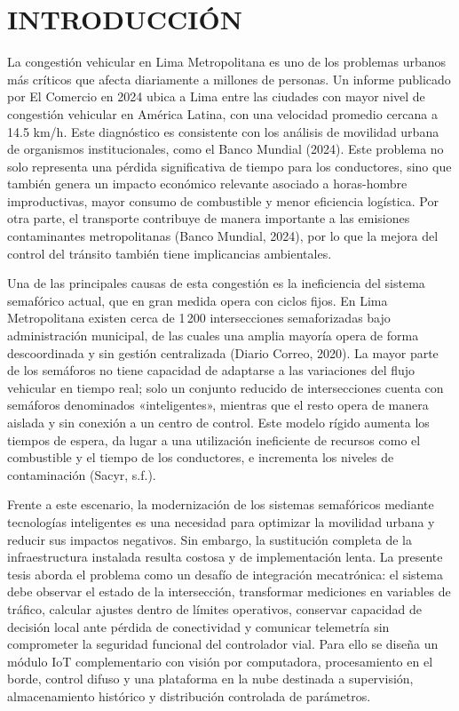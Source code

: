\chapter*{INTRODUCCIÓN}\label{introduccion}

La congestión vehicular en Lima Metropolitana es uno de los problemas urbanos más críticos que afecta
diariamente a millones de personas. Un informe publicado por El Comercio en 2024 ubica a Lima entre las
ciudades con mayor nivel de congestión vehicular en América Latina, con una velocidad promedio cercana a
14.5 km/h. Este diagnóstico es consistente con los análisis de movilidad urbana de organismos
institucionales, como el Banco Mundial (2024). Este problema no solo representa una pérdida significativa de tiempo para los conductores, sino
que también genera un impacto económico relevante asociado a horas-hombre improductivas, mayor consumo de
combustible y menor eficiencia logística. Por otra parte, el transporte contribuye de manera importante a
las emisiones contaminantes metropolitanas (Banco Mundial, 2024), por lo que la mejora del control del
tránsito también tiene implicancias ambientales.

Una de las principales causas de esta congestión es la ineficiencia del sistema semafórico actual, que en
gran medida opera con ciclos fijos. En Lima Metropolitana existen cerca de 1\,200 intersecciones
semaforizadas bajo administración municipal, de las cuales una amplia mayoría opera de forma descoordinada
y sin gestión centralizada (Diario Correo, 2020). La mayor parte de los semáforos no tiene capacidad de
adaptarse a las variaciones del flujo vehicular en tiempo real; solo un conjunto reducido de intersecciones
cuenta con semáforos denominados «inteligentes», mientras que el resto opera de manera aislada y sin
conexión a un centro de control. Este modelo rígido aumenta los tiempos de espera, da lugar a una
utilización ineficiente de recursos como el combustible y el tiempo de los conductores, e incrementa los
niveles de contaminación (Sacyr, s.f.).

Frente a este escenario, la modernización de los sistemas semafóricos mediante tecnologías inteligentes es
una necesidad para optimizar la movilidad urbana y reducir sus impactos negativos. Sin embargo, la
sustitución completa de la infraestructura instalada resulta costosa y de implementación lenta. La presente
tesis aborda el problema como un desafío de integración mecatrónica: el sistema debe observar el estado de
la intersección, transformar mediciones en variables de tráfico, calcular ajustes dentro de límites
operativos, conservar capacidad de decisión local ante pérdida de conectividad y comunicar telemetría sin
comprometer la seguridad funcional del controlador vial. Para ello se diseña un módulo IoT complementario
con visión por computadora, procesamiento en el borde, control difuso y una plataforma en la nube destinada
a supervisión, almacenamiento histórico y distribución controlada de parámetros.

